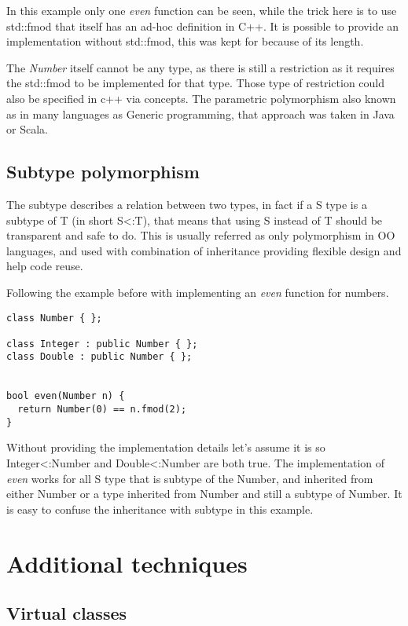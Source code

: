 \documentclass[a4paper, 10pt, conference ]{llncs}
\let\cite\parencite
\begin{document}
In this example only one \emph{even} function can be seen, while the trick here is to use std::fmod that itself has an ad-hoc definition in C++. It is possible to provide an implementation without std::fmod, this was kept for because of its length.

The \emph{Number} itself cannot be any type, as there is still a restriction as it requires the std::fmod to be implemented for that type. Those type of restriction could also be specified in c++ via concepts\cite{dos2006specifying}. The parametric polymorphism also known as in many languages as Generic programming, that approach was taken in Java or Scala.

\subsection{Subtype polymorphism}

The subtype describes a relation between two types, in fact if a S type is a subtype of T (in short S<:T), that means that using S instead of T should be transparent and safe to do\cite{liskov1988data}. This is usually referred as only polymorphism in OO languages, and used with combination of inheritance providing flexible design and help code reuse.

Following the example before with implementing an \emph{even} function for numbers.

\begin{verbatim}
class Number { };

class Integer : public Number { };
class Double : public Number { };


bool even(Number n) {
  return Number(0) == n.fmod(2);
}
\end{verbatim}

Without providing the implementation details let's assume it is so Integer<:Number and Double<:Number are both true. The implementation of \emph{even} works for all S type that is subtype of the Number, and inherited from either Number or a type inherited from Number and still a subtype of Number. It is easy to confuse the inheritance with subtype in this example.

\section{Additional techniques}

\subsection{Virtual classes}
\end{document}
